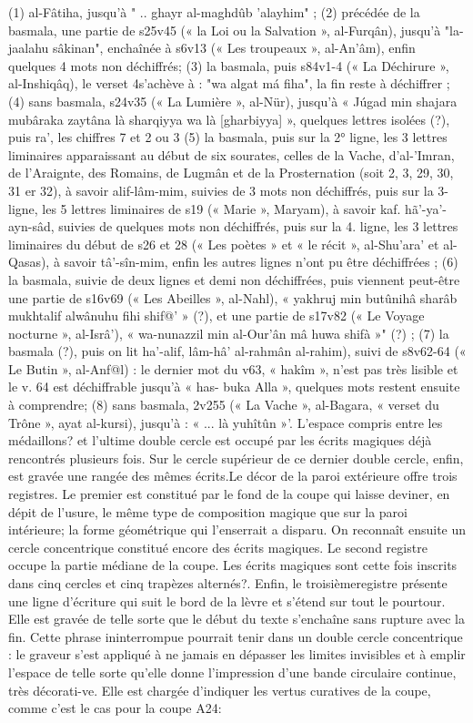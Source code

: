 (1) al-Fâtiha, jusqu'à
" .. ghayr al-maghdûb 'alayhim" ;
(2) précédée de la basmala, une partie de s25v45 (« la Loi ou la
Salvation », al-Furqân), jusqu'à "la-jaalahu sâkinan", enchaînée à s6v13
(« Les troupeaux », al-An'âm), enfin quelques 4 mots non déchiffrés;
(3) la basmala, puis s84v1-4 (« La Déchirure », al-Inshiqâq), le verset
4s'achève à : "wa algat má fiha", la fin reste à déchiffrer ;
(4) sans basmala, s24v35 (« La Lumière », al-Nür), jusqu'à « Júgad
min shajara mubâraka zaytâna là sharqiyya wa là [gharbiyya] », quelques lettres isolées (?), puis ra', les chiffres 7 et 2 ou 3
(5) la basmala, puis sur la 2° ligne, les 3 lettres liminaires apparaissant
au début de six sourates, celles de la Vache, d'al-'Imran, de l'Araignte, des Romains, de Lugmân et de la Prosternation (soit 2, 3, 29, 30, 31 er
32), à savoir alif-lâm-mim, suivies de 3 mots non déchiffrés, puis sur la 3-ligne, les 5 lettres liminaires de s19 (« Marie », Maryam), à savoir kaf.
hã'-ya'-ayn-sâd, suivies de quelques mots non déchiffrés, puis sur la 4. ligne, les 3 lettres liminaires du début de s26 et   28 (« Les poètes » et « le
récit », al-Shu'ara' et al-Qasas), à savoir tâ'-sîn-mim, enfin les autres
lignes n'ont pu être déchiffrées ;
(6) la basmala, suivie de deux lignes et demi non déchiffrées, puis viennent peut-être une partie de s16v69 (« Les Abeilles », al-Nahl),
« yakhruj min butûnihâ sharâb mukhtalif alwânuhu fihi shif@' » (?), et une partie de s17v82 (« Le Voyage nocturne », al-Isrâ'), « wa-nunazzil
min al-Our'ân mâ huwa shifà »" (?) ;
(7) la basmala (?), puis on lit ha'-alif, lâm-hâ' al-rahmân al-rahim), suivi de s8v62-64 (« Le Butin », al-Anf@l) : le dernier mot du v63,
« hakîm », n'est pas très lisible et le v. 64 est déchiffrable jusqu'à « has-
buka Alla », quelques mots restent ensuite à comprendre;
(8) sans basmala, 2v255 (« La Vache », al-Bagara, « verset du
Trône », ayat al-kursi), jusqu'à : « ... là yuhîtûn »'.
L'espace compris entre les médaillons? et l'ultime double cercle est
occupé par les écrits magiques déjà rencontrés plusieurs fois. Sur le cercle supérieur de ce dernier double cercle, enfin, est gravée une rangée
des mêmes écrits.Le décor de la paroi extérieure offre trois registres. Le premier est constitué par le fond de la coupe qui laisse deviner, en dépit de l'usure, le même type de composition magique que sur la paroi intérieure; la forme géométrique qui l'enserrait a disparu. On reconnaît ensuite un cercle concentrique constitué encore des écrits magiques. Le second registre occupe la partie médiane de la coupe. Les écrits magiques sont cette fois inscrits dans cinq cercles et cinq trapèzes alternés?. Enfin, le troisièmeregistre présente une ligne d'écriture qui suit le bord de la lèvre et s'étend sur tout le pourtour. Elle est gravée de telle sorte que le début du texte s'enchaîne sans rupture avec la fin. Cette phrase ininterrompue pourrait tenir dans un double cercle concentrique : le graveur s'est appliqué à ne jamais en dépasser les limites invisibles et à emplir l'espace de telle sorte qu'elle donne l'impression d'une bande circulaire continue, très décorati-ve. Elle est chargée d'indiquer les vertus curatives de la coupe, comme c'est le cas pour la coupe A24:
